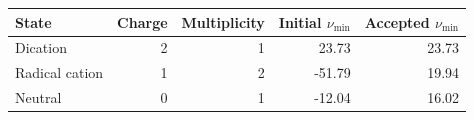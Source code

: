 \begin{tabular}{lrrrr}\toprule
State & Charge & Multiplicity & Initial $\nu_{\min}$ & Accepted $\nu_{\min}$\\\midrule
Dication & 2 & 1 & 23.73 & 23.73\\
Radical cation & 1 & 2 & -51.79 & 19.94\\
Neutral & 0 & 1 & -12.04 & 16.02\\
\bottomrule\end{tabular}
